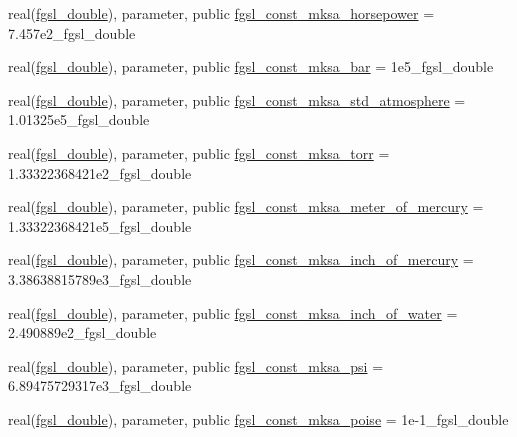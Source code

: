\begin{DoxyCompactItemize}
\item 
real(\hyperlink{namespacefgsl_a9af5113378e0f000eb479d3f90196ddf}{fgsl\+\_\+double}), parameter, public \hyperlink{namespacefgsl_af97c5cddea274909ba83c36dc36e90a3}{fgsl\+\_\+const\+\_\+mksa\+\_\+horsepower} = 7.\+457e2\+\_\+fgsl\+\_\+double
\item 
real(\hyperlink{namespacefgsl_a9af5113378e0f000eb479d3f90196ddf}{fgsl\+\_\+double}), parameter, public \hyperlink{namespacefgsl_a218481ee71a34d944cbc21affd61bc8a}{fgsl\+\_\+const\+\_\+mksa\+\_\+bar} = 1e5\+\_\+fgsl\+\_\+double
\item 
real(\hyperlink{namespacefgsl_a9af5113378e0f000eb479d3f90196ddf}{fgsl\+\_\+double}), parameter, public \hyperlink{namespacefgsl_ae2440545adbbcd420b11d8e12db0a681}{fgsl\+\_\+const\+\_\+mksa\+\_\+std\+\_\+atmosphere} = 1.\+01325e5\+\_\+fgsl\+\_\+double
\item 
real(\hyperlink{namespacefgsl_a9af5113378e0f000eb479d3f90196ddf}{fgsl\+\_\+double}), parameter, public \hyperlink{namespacefgsl_aba0c7c1da846e36ceea84cec02bb6478}{fgsl\+\_\+const\+\_\+mksa\+\_\+torr} = 1.\+33322368421e2\+\_\+fgsl\+\_\+double
\item 
real(\hyperlink{namespacefgsl_a9af5113378e0f000eb479d3f90196ddf}{fgsl\+\_\+double}), parameter, public \hyperlink{namespacefgsl_a7f5943b971d1e27da66ed35eb36865a0}{fgsl\+\_\+const\+\_\+mksa\+\_\+meter\+\_\+of\+\_\+mercury} = 1.\+33322368421e5\+\_\+fgsl\+\_\+double
\item 
real(\hyperlink{namespacefgsl_a9af5113378e0f000eb479d3f90196ddf}{fgsl\+\_\+double}), parameter, public \hyperlink{namespacefgsl_a66f697c831591659ce7e9305e7c18c46}{fgsl\+\_\+const\+\_\+mksa\+\_\+inch\+\_\+of\+\_\+mercury} = 3.\+38638815789e3\+\_\+fgsl\+\_\+double
\item 
real(\hyperlink{namespacefgsl_a9af5113378e0f000eb479d3f90196ddf}{fgsl\+\_\+double}), parameter, public \hyperlink{namespacefgsl_afdebd41de62af9d5a4b9ed6efcf9cea2}{fgsl\+\_\+const\+\_\+mksa\+\_\+inch\+\_\+of\+\_\+water} = 2.\+490889e2\+\_\+fgsl\+\_\+double
\item 
real(\hyperlink{namespacefgsl_a9af5113378e0f000eb479d3f90196ddf}{fgsl\+\_\+double}), parameter, public \hyperlink{namespacefgsl_af1bb05c944f3cc7eca8c2ffb562c1cfe}{fgsl\+\_\+const\+\_\+mksa\+\_\+psi} = 6.\+89475729317e3\+\_\+fgsl\+\_\+double
\item 
real(\hyperlink{namespacefgsl_a9af5113378e0f000eb479d3f90196ddf}{fgsl\+\_\+double}), parameter, public \hyperlink{namespacefgsl_a1b18b9e73da6e94185746f50a31ca4c3}{fgsl\+\_\+const\+\_\+mksa\+\_\+poise} = 1e-\/1\+\_\+fgsl\+\_\+double

\end{DoxyCompactItemize}
